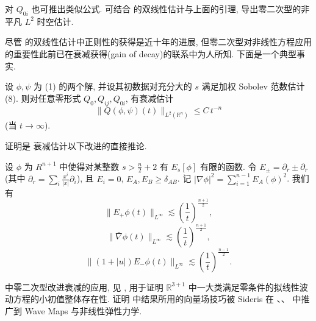 \begin{remark}\label{rem:1.20}
对 $Q_{0i}$ 也可推出类似公式. 可结合 的双线性估计与上面的引理, 导出零二次型的非平凡 $L^{2}$ 时空估计.\end{remark}

\begin{remark}\label{rem:1.21}
尽管 的双线性估计中正则性的获得是近十年的进展, 但零二次型对非线性方程应用的重要性此前已在衰减获得(gain of decay)的联系中为人所知. 下面是一个典型事实.\end{remark}

\begin{proposition}\label{prop:1.22}
设 $\phi,\psi$ 为 (1) 的两个解, 并设其初数据对充分大的 $s$ 满足加权 Sobolev 范数估计 (8). 则对任意零形式 $Q_{0},Q_{ij},Q_{0i}$, 有衰减估计
\[
\|Q(\phi,\psi)(t)\|_{L^{2}(\mathbb{R}^{n})}\leq C\, t^{-n}
\]
(当 $t \to \infty$).\end{proposition}

证明是 衰减估计以下改进的直接推论.
\begin{proposition}[剥离衰减性质]\label{prop:1.23}
设 $\phi$ 为 $R^{n+1}$ 中使得对某整数 $s > \frac{n}{2} + 2$ 有 $E_s[\phi]$ 有限的函数. 令 $E_\pm = \partial_r \pm \partial_r$(其中 $\partial_r = \sum_i \frac{x^i}{|x|}\partial_i$), 且 $E_i = 0$, $E_A, E_B \geq \delta_{AB}$. 记 $|\nabla \phi|^2 = \sum_{i=1}^{n-1} E_A(\phi)^2$. 我们有
\[
\|E_{+}\phi(t)\|_{L^{\infty}}\lesssim\left(\frac{1}{t}\right)^{\frac{n+1}{2}},
\]
\[
\|\bar{\nabla}\phi(t)\|_{L^{\infty}}\lesssim\left(\frac{1}{t}\right)^{\frac{n+1}{2}},
\]
\[
\|\left(1+|u|\right)E_{-}\phi(t)\|_{L^{\infty}}\lesssim\left(\frac{1}{t}\right)^{\frac{n-1}{2}}.
\]
\end{proposition}

\begin{remark}\label{rem:1.24}
 中零二次型改进衰减的应用, 见 \cite{klai28}, 用于证明 $\mathbb{R}^{3+1}$ 中一大类满足零条件的拟线性波动方程的小初值整体存在性. 证明 \cite{klai28} 中结果所用的向量场技巧被 Sideris 在 \cite{klai63}、\cite{klai64}、\cite{klai65} 中推广到 Wave Maps 与非线性弹性力学.\end{remark}


